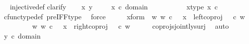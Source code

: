 \begin{isabellebody}
%
\isadelimproof
\ %
\endisadelimproof
%
\isatagproof
{}\isamarkupfalse%
\ injective{\isacharunderscore}{\kern0pt}def\isanewline
{}\isamarkupfalse%
{\isacharparenleft}{\kern0pt}clarify{\isacharparenright}{\kern0pt}\isanewline
\ \ \isamarkupfalse%
\ x\ y\ \isanewline
\ \ \isamarkupfalse%
\ {\isachardoublequoteopen}x\ {\isasymin}\isactrlsub c\ domain\ {\isacharparenleft}{\kern0pt}{\isasymlangle}{\isasymt}{\isacharcomma}{\kern0pt}\ {\isasymt}{\isasymrangle}\ {\isasymamalg}{\isasymlangle}{\isasymf}{\isacharcomma}{\kern0pt}\ {\isasymf}{\isasymrangle}{\isacharparenright}{\kern0pt}{\isachardoublequoteclose}\ \isanewline
\ \ \isamarkupfalse%
\ \isamarkupfalse%
\ x{\isacharunderscore}{\kern0pt}type{\isacharcolon}{\kern0pt}\ {\isachardoublequoteopen}x\ {\isasymin}\isactrlsub c\ {\isacharparenleft}{\kern0pt}{\isasymone}{\isasymCoprod}{\isasymone}{\isacharparenright}{\kern0pt}{\isachardoublequoteclose}\ \ \isanewline
\ \ \ \ \isamarkupfalse%
\ cfunc{\isacharunderscore}{\kern0pt}type{\isacharunderscore}{\kern0pt}def\ pre{\isacharunderscore}{\kern0pt}IFF{\isacharunderscore}{\kern0pt}type\ \isamarkupfalse%
\ force\isanewline
\ \ \isamarkupfalse%
\ \isamarkupfalse%
\ x{\isacharunderscore}{\kern0pt}form{\isacharcolon}{\kern0pt}\ {\isachardoublequoteopen}{\isacharparenleft}{\kern0pt}{\isasymexists}\ w{\isachardot}{\kern0pt}\ {\isacharparenleft}{\kern0pt}w\ {\isasymin}\isactrlsub c\ {\isasymone}\ {\isasymand}\ x\ {\isacharequal}{\kern0pt}\ {\isacharparenleft}{\kern0pt}left{\isacharunderscore}{\kern0pt}coproj\ {\isasymone}\ {\isasymone}{\isacharparenright}{\kern0pt}\ {\isasymcirc}\isactrlsub c\ w{\isacharparenright}{\kern0pt}{\isacharparenright}{\kern0pt}\isanewline
\ \ \ \ \ \ {\isasymor}\ \ {\isacharparenleft}{\kern0pt}{\isasymexists}\ w{\isachardot}{\kern0pt}\ {\isacharparenleft}{\kern0pt}w\ {\isasymin}\isactrlsub c\ {\isasymone}\ {\isasymand}\ x\ {\isacharequal}{\kern0pt}\ {\isacharparenleft}{\kern0pt}right{\isacharunderscore}{\kern0pt}coproj\ {\isasymone}\ {\isasymone}{\isacharparenright}{\kern0pt}\ {\isasymcirc}\isactrlsub c\ w{\isacharparenright}{\kern0pt}{\isacharparenright}{\kern0pt}{\isachardoublequoteclose}\isanewline
\ \ \ \ \isamarkupfalse%
\ coprojs{\isacharunderscore}{\kern0pt}jointly{\isacharunderscore}{\kern0pt}surj\ \isamarkupfalse%
\ auto\isanewline
\isanewline
\ \ \isamarkupfalse%
\ {\isachardoublequoteopen}y\ {\isasymin}\isactrlsub c\ domain\ {\isacharparenleft}{\kern0pt}{\isasymlangle}{\isasymt}{\isacharcomma}{\kern0pt}\ {\isasymt}{\isasymrangle}\ {\isasymamalg}{\isasymlangle}{\isasymf}{\isacharcomma}{\kern0pt}\ {\isasymf}{\isasymrangle}{\isacharparenright}{\kern0pt}{\isachardoublequoteclose}\ \isanewline

\end{isabellebody}
